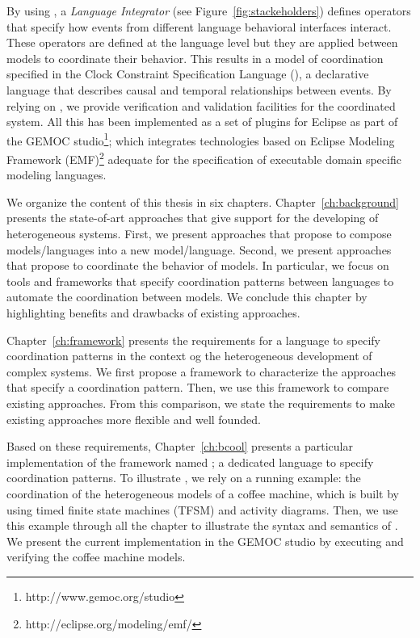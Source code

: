 By using \bcool, a \emph{Language Integrator} (see Figure~\ref{fig:stackeholders}) defines operators that specify how events from different language behavioral interfaces interact. These operators are defined at the language level but they are applied between models to coordinate their behavior. This results in a model of coordination specified in the Clock Constraint Specification Language (\ccsl), a declarative language that describes causal and temporal relationships between events. By relying on \ccsl, we provide verification and validation facilities for the coordinated system. All this has been implemented as a set of plugins for Eclipse as part of the GEMOC studio\footnote{http://www.gemoc.org/studio}; which integrates technologies based on Eclipse Modeling Framework (EMF)\footnote{http://eclipse.org/modeling/emf/} adequate for the specification of executable domain specific modeling languages. %

We organize the content of this thesis in six chapters. Chapter~\ref{ch:background} presents the state-of-art approaches that give support for the developing of heterogeneous systems. First, we present approaches that propose to compose models/languages into a new model/language. Second, we present approaches that propose to coordinate the behavior of models. In particular, we focus on tools and frameworks that specify coordination patterns between languages to automate the coordination between models. We conclude this chapter by highlighting benefits and drawbacks of existing approaches.     
 
Chapter~\ref{ch:framework} presents the requirements for a language to specify coordination patterns in the context og the heterogeneous development of complex systems. We first propose a framework to characterize the approaches that specify a coordination pattern. Then, we use this framework to compare existing approaches. From this comparison, we state the requirements to make existing approaches more flexible and well founded. 

Based on these requirements, Chapter~\ref{ch:bcool} presents a particular implementation of the framework named \bcool; a dedicated language to specify coordination patterns. To illustrate \bcool, we rely on a running example: the coordination of the heterogeneous models of a coffee machine, which is built by using timed finite state machines (TFSM) and activity diagrams. Then, we use this example through all the chapter to illustrate the syntax and semantics of \bcool. We present the current implementation in the GEMOC studio by executing and verifying the coffee machine models. 

